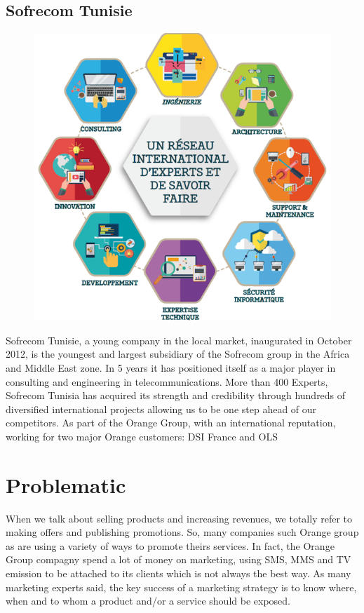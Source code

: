 \subsection{Sofrecom Tunisie}
\label{sec:sec01}
\begin{figure}[h!]
	\centering
	\includegraphics[height=0.4\textheight]{fig01/sofrecomfields}
	\label{fig:FilialesEtClients}
\end{figure}
Sofrecom Tunisie, a young company in the local market, inaugurated in October 2012, is the youngest and largest subsidiary of the Sofrecom group in the Africa and Middle East zone.
In 5 years it has positioned itself as a major player in consulting and engineering in telecommunications.
More than 400 Experts, Sofrecom Tunisia has acquired its strength and credibility through hundreds of diversified international projects allowing us to be one step ahead of our competitors.
As part of the Orange Group, with an international reputation, working for two major Orange customers: DSI France and OLS


\section{Problematic}
\label{subsec:subsec01}

When we talk about selling products and increasing revenues, we totally refer to making offers and publishing promotions.
 So, many companies such Orange group as are using a variety of ways to promote theirs services. In fact, the Orange 
 Group compagny spend a lot of money on marketing, using SMS, MMS and TV emission to be attached to its clients 
 which is not always the best way. As many marketing experts said, the key success of a marketing strategy is to 
 know where, when and to whom a product and/or a service should be exposed. 
 
